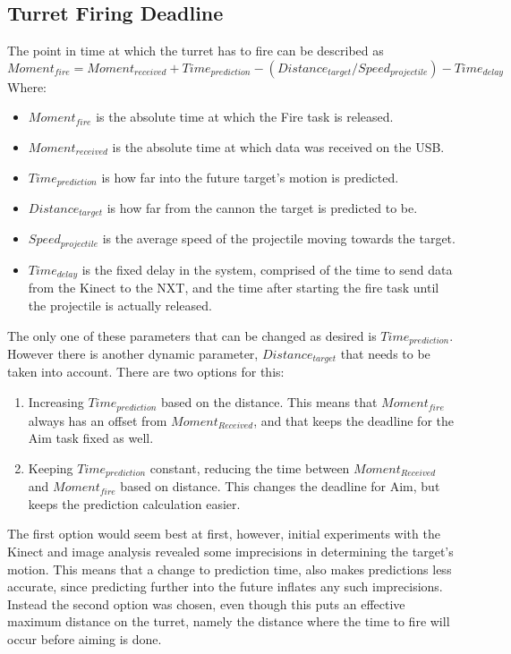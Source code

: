 \subsection{Turret Firing Deadline}
The point in time at which the turret has to fire can be described as\\
\begin{math}
Moment_{fire} = Moment_{received} + Time_{prediction} - ( Distance_{target} / Speed_{projectile} )
 - Time_{delay}
\end{math}
Where:
\begin{itemize}
  \item $Moment_{fire}$ is the absolute time at which the Fire task is released.
  \item $Moment_{received}$ is the absolute time at which data was received on the USB.
  \item $Time_{prediction}$ is how far into the future target's motion is predicted.
  \item $Distance_{target}$ is how far from the cannon the target is predicted to be.
  \item $Speed_{projectile}$ is the average speed of the projectile moving towards the target.
  \item $Time_{delay}$ is the fixed delay in the system, comprised of the time to send data from the
  Kinect to the NXT, and the time after starting the fire task until the projectile is actually released.
\end{itemize}
The only one of these parameters that can be changed as desired is $Time_{prediction}$. However
there is another dynamic parameter, $Distance_{target}$ that needs to be taken into account.
There are two options for this:
\begin{enumerate}
  \item Increasing $Time_{prediction}$ based on the distance. This means that $Moment_{fire}$
  always has an offset from $Moment_{Received}$, and that keeps the deadline for the Aim
  task fixed as well.
  \item Keeping $Time_{prediction}$ constant, reducing the time between $Moment_{Received}$
  and $Moment_{fire}$ based on distance. This changes the deadline for Aim, but keeps
  the prediction calculation easier.
\end{enumerate}
The first option would seem best at first, however, initial experiments with the Kinect and
image analysis revealed some imprecisions in determining the target's motion. This means
that a change to prediction time, also makes predictions less accurate, since predicting
further into the future inflates any such imprecisions. Instead the second option was chosen,
even though this puts an effective maximum distance on the turret, namely the distance where
the time to fire will occur before aiming is done.

